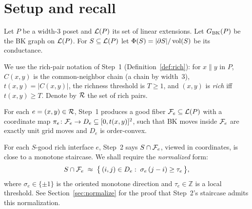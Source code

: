 
\begin{abstract}
Step~6 leaves us with the coherent case: almost all rich interfaces
carry pairwise-compatible local staircase rules.
Step~7 upgrades this pairwise compatibility into a single global
scalar rule, and then shows that the resulting global-threshold
description forces the poset to degenerate to a layered / 1D regime,
which in width~$3$ is directly balanced or reducible.
The core new technical content is a cocycle-to-potential upgrade on a
weighted interface graph; all other pieces reduce to double counting,
gradient integration on a connected graph, or direct averaging.
\end{abstract}


\section{Setup and recall}

Let $P$ be a width-3 poset and $\mathcal{L}(P)$ its set of linear extensions.
Let $G_{\mathrm{BK}}(P)$ be the BK graph on $\mathcal{L}(P)$.
For $S\subseteq\mathcal{L}(P)$ let $\Phi(S)=|\partial S|/\operatorname{vol}(S)$ be its
conductance.

We use the rich-pair notation of Step~1 (Definition~\ref{def:rich}):
for $x\parallel y$ in $P$, $C(x,y)$ is the common-neighbor chain (a
chain by width~$3$), $t(x,y)=|C(x,y)|$, the richness threshold is
$T\ge 1$, and $(x,y)$ is \emph{rich} iff $t(x,y)\ge T$.
Denote by $\mathcal{R}$ the set of rich pairs.

\begin{definition}
For each $e=(x,y)\in\mathcal{R}$, Step~1 produces a good fiber
$\mathcal{F}_{e}\subseteq\mathcal{L}(P)$ with a coordinate map
$\pi_e\colon\mathcal{F}_{e}\to D_e\subseteq[0,t(x,y)]^2$, such that BK moves
inside $\mathcal{F}_{e}$ are exactly unit grid moves and $D_e$ is
order-convex.
\end{definition}

\begin{definition}
\label{def:local-staircase}
For each $S$-good rich interface $e$, Step~2 says $S\cap\mathcal{F}_{e}$,
viewed in coordinates, is close to a monotone staircase.
We shall require the \emph{normalized} form:
\begin{equation}\label{eq:signed-threshold}
  S\cap\mathcal{F}_{e}
  \;\approx\;
  \bigl\{\,(i,j)\in D_e :\; \sigma_e\,(j-i) \ge \tau_e\,\bigr\},
\end{equation}
where $\sigma_e\in\{\pm1\}$ is the oriented monotone direction and
$\tau_e\in\mathbb{Z}$ is a local threshold.
See Section~\ref{sec:normalize} for the proof that Step~2's
staircase admits this normalization.
\end{definition}

